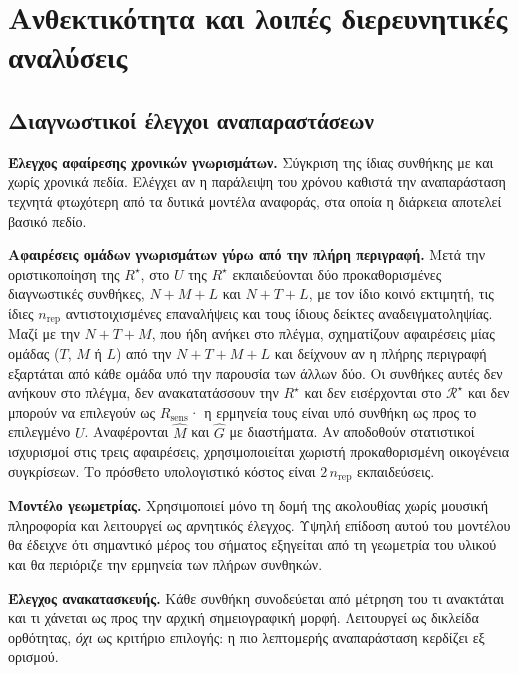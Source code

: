 \documentclass[11pt,a4paper]{article}
\begin{document}
\section{Ανθεκτικότητα και λοιπές διερευνητικές αναλύσεις}\label{app:robust}

\subsection{Διαγνωστικοί έλεγχοι αναπαραστάσεων}\label{app:robust-repr}

\textbf{Έλεγχος αφαίρεσης χρονικών γνωρισμάτων.} Σύγκριση της ίδιας συνθήκης με και χωρίς χρονικά πεδία. Ελέγχει αν η παράλειψη του χρόνου καθιστά την αναπαράσταση τεχνητά φτωχότερη από τα δυτικά μοντέλα αναφοράς, στα οποία η διάρκεια αποτελεί βασικό πεδίο.

\textbf{Αφαιρέσεις ομάδων γνωρισμάτων γύρω από την πλήρη περιγραφή.} Μετά την οριστικοποίηση της \(R^\star\), στο \(U\) της \(R^\star\) εκπαιδεύονται δύο προκαθορισμένες διαγνωστικές συνθήκες, \(N{+}M{+}L\) και \(N{+}T{+}L\), με τον ίδιο κοινό εκτιμητή, τις ίδιες \(n_{\mathrm{rep}}\) αντιστοιχισμένες επαναλήψεις και τους ίδιους δείκτες αναδειγματοληψίας. Μαζί με την \(N{+}T{+}M\), που ήδη ανήκει στο πλέγμα, σχηματίζουν αφαιρέσεις μίας ομάδας (\(T\), \(M\) ή \(L\)) από την \(N{+}T{+}M{+}L\) και δείχνουν αν η πλήρης περιγραφή εξαρτάται από κάθε ομάδα υπό την παρουσία των άλλων δύο. Οι συνθήκες αυτές δεν ανήκουν στο πλέγμα, δεν ανακατατάσσουν την \(R^\star\) και δεν εισέρχονται στο \(\mathcal R^\star\) και δεν μπορούν να επιλεγούν ως \(R_{\mathrm{sens}}\)· η ερμηνεία τους είναι υπό συνθήκη ως προς το επιλεγμένο \(U\). Αναφέρονται \(\widehat M\) και \(\widehat G\) με διαστήματα. Αν αποδοθούν στατιστικοί ισχυρισμοί στις τρεις αφαιρέσεις, χρησιμοποιείται χωριστή προκαθορισμένη οικογένεια συγκρίσεων. Το πρόσθετο υπολογιστικό κόστος είναι \(2\,n_{\mathrm{rep}}\) εκπαιδεύσεις.

\textbf{Μοντέλο γεωμετρίας.} Χρησιμοποιεί μόνο τη δομή της ακολουθίας χωρίς μουσική πληροφορία και λειτουργεί ως αρνητικός έλεγχος. Υψηλή επίδοση αυτού του μοντέλου θα έδειχνε ότι σημαντικό μέρος του σήματος εξηγείται από τη γεωμετρία του υλικού και θα περιόριζε την ερμηνεία των πλήρων συνθηκών.

\textbf{Έλεγχος ανακατασκευής.} Κάθε συνθήκη συνοδεύεται από μέτρηση του τι ανακτάται και τι χάνεται ως προς την αρχική σημειογραφική μορφή. Λειτουργεί ως δικλείδα ορθότητας, \emph{όχι} ως κριτήριο επιλογής: η πιο λεπτομερής αναπαράσταση κερδίζει εξ ορισμού.
\end{document}
